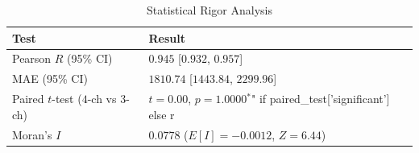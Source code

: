 \begin{table}[h]
\centering
\caption{Statistical Rigor Analysis}
\label{tab:stats}
\begin{tabular}{@{}ll@{}}
\toprule
\textbf{Test} & \textbf{Result} \\
\midrule
Pearson $R$ (95\% CI) & $0.945$ [$0.932$, $0.957$] \\
MAE (95\% CI) & $1810.74$ [$1443.84$, $2299.96$] \\
\midrule
Paired $t$-test ($4$-ch vs $3$-ch) & $t=0.00$, $p=1.0000$$^{*}$" if paired_test['significant'] else r \\
\midrule
Moran's $I$ & $0.0778$ ($E[I] = -0.0012$, $Z = 6.44$) \\
\bottomrule
\end{tabular}
\end{table}
